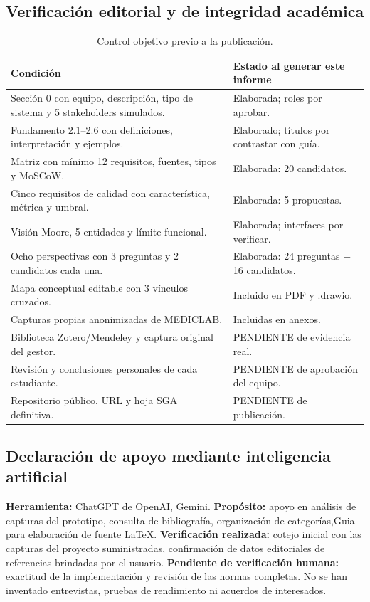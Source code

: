\subsection{Verificación editorial y de integridad académica}
\begin{table}[H]\centering\small
\caption{Control objetivo previo a la publicación.}\label{tab:control}
\begin{tabularx}{\linewidth}{@{}Xp{3.0cm}@{}}\toprule
\textbf{Condición} & \textbf{Estado al generar este informe}\\\midrule
Sección 0 con equipo, descripción, tipo de sistema y 5 stakeholders simulados. & Elaborada; roles por aprobar.\\
Fundamento 2.1--2.6 con definiciones, interpretación y ejemplos. & Elaborado; títulos por contrastar con guía.\\
Matriz con mínimo 12 requisitos, fuentes, tipos y MoSCoW. & Elaborada: 20 candidatos.\\
Cinco requisitos de calidad con característica, métrica y umbral. & Elaborada: 5 propuestas.\\
Visión Moore, 5 entidades y límite funcional. & Elaborada; interfaces por verificar.\\
Ocho perspectivas con 3 preguntas y 2 candidatos cada una. & Elaborada: 24 preguntas + 16 candidatos.\\
Mapa conceptual editable con 3 vínculos cruzados. & Incluido en PDF y .drawio.\\
Capturas propias anonimizadas de MEDICLAB. & Incluidas en anexos.\\
Biblioteca Zotero/Mendeley y captura original del gestor. & PENDIENTE de evidencia real.\\
Revisión y conclusiones personales de cada estudiante. & PENDIENTE de aprobación del equipo.\\
Repositorio público, URL y hoja SGA definitiva. & PENDIENTE de publicación.\\\bottomrule
\end{tabularx}
\end{table}

\subsection{Declaración de apoyo mediante inteligencia artificial}
\textbf{Herramienta:} ChatGPT de OpenAI, Gemini. \textbf{Propósito:} apoyo en análisis de capturas del prototipo, consulta de bibliografía, organización de categorías,Guia para elaboración de fuente LaTeX. \textbf{Verificación realizada:} cotejo inicial con las capturas del proyecto suministradas, confirmación de datos editoriales de referencias brindadas por el usuario. \textbf{Pendiente de verificación humana:} exactitud de la implementación y revisión de las normas completas. No se han inventado entrevistas, pruebas de rendimiento ni acuerdos de interesados.

